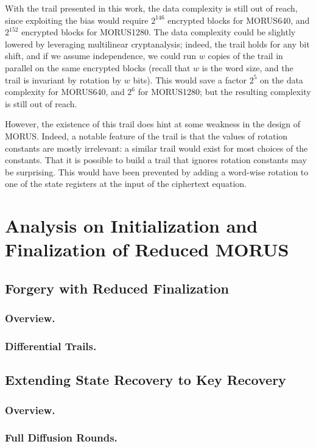 \documentclass{llncs}
\newcommand{\cipher}[1]{\textsf{#1}}
\begin{document}
With the trail presented in this work, the data complexity is still out of reach, since exploiting the bias would require $2^{146}$ encrypted blocks for \cipher{MORUS640}, and $2^{152}$ encrypted blocks for \cipher{MORUS1280}. The data complexity could be slightly lowered by leveraging multilinear cryptanalysis; indeed, the trail holds for any bit shift, and if we assume independence, we could run $w$ copies of the trail in parallel on the same encrypted blocks (recall that $w$ is the word size, and the trail is invariant by rotation by $w$ bits). This would save a factor $2^5$ on the data complexity for \cipher{MORUS640}, and $2^6$ for \cipher{MORUS1280}; but the resulting complexity is still out of reach.

However, the existence of this trail does hint at some weakness in the design of \cipher{MORUS}. Indeed, a notable feature of the trail is that the values of rotation constants are mostly irrelevant: a similar trail would exist for most choices of the constants. That it is possible to build a trail that ignores rotation constants may be surprising. This would have been prevented by adding a word-wise rotation to one of the state registers at the input of the ciphertext equation.


\section{Analysis on Initialization and Finalization of Reduced MORUS}

\subsection{Forgery with Reduced Finalization}
\subsubsection{Overview.}
\subsubsection{Differential Trails.}

\subsection{Extending State Recovery to Key Recovery}
\subsubsection{Overview.}
\subsubsection{Full Diffusion Rounds.}
\end{document}
